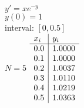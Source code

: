 {
$y' = xe^{-y}$\\
$y(0)=1$\\
interval: $[0,0.5]$\\
$N=5$
}
{
	$\begin{array}{l | l}
		x_i & y_i    \\ \hline
		0.0 & 1.0000 \\
		0.1 & 1.0000 \\
		0.2 & 1.0037 \\
		0.3 & 1.0110 \\
		0.4 & 1.0219 \\
		0.5 & 1.0363
	\end{array}$
}